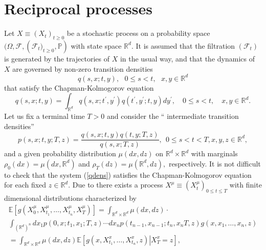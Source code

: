 \documentclass[a4paper,11pt]{amsart}
\theoremstyle{plain}
\theoremstyle{remark}
\begin{document}
\section{Reciprocal  processes}
\label{sec:rp}
Let $X\equiv\left(  X_{t}\right)  _{t\geq0}$ be a stochastic process on a
probability space $(  \Omega,\mathcal{F},\left(  \mathcal{F}_{t})
_{t\geq0},\mathbb{P}\right)  $ with state space $\mathbb{R}^{d}$. It is
assumed that the filtration $( \mathcal{F}_{t})  $ is generated by
the trajectories of $X$ in the usual way, and that the dynamics of $X$ are
governed by non-zero transition densities
\begin{equation}
q(s,x;t,y),\text{ }0\leq s<t,\text{ }x,y\in\mathbb{R}^{d} \label{pdens}%
\end{equation}
that satisfy the Chapman-Kolmogorov equation%
\begin{equation}
q(s,x;t,y)=\int_{\mathbb{R}^{d}}q(s,x;t^{\prime},y^{\prime})q(t^{\prime
},y^{\prime};t,y)dy^{\prime},\quad 0\leq s<t,\quad x,y\in\mathbb{R}^{d}.
\label{schroe0}%
\end{equation}
Let us fix a terminal time $T>0$ and consider the \textquotedblleft
intermediate transition densities\textquotedblright%
\begin{equation}
p(s,x;t,y;T,z)=\frac{q(s,x;t,y)q(t,y;T,z)}{q(s,x;T,z)},\ \ 0\leq s<t<T,\text{
}x,y,z\in\mathbb{R}^{d}, \label{qdens}%
\end{equation}
and a given probability distribution $\mu(dx,dz)$ on $\mathbb{R}^{d}%
\times\mathbb{R}^{d}$ with marginals $\rho_{0}(dx)=\mu(dx,\mathbb{R}^{d})$ and
$\rho_{T}(dz)=\mu(\mathbb{R}^{d},dz),$ respectively. It is not difficult to
check that the system (\ref{qdens}) satisfies the Chapman-Kolmogorov equation
for each fixed $z\in\mathbb{R}^{d}.$ Due to \cite{Jam74} there exists a
process $X^{\mu}\equiv\left(  X_{t}^{\mu}\right)  _{0\leq t\leq T}$ with
finite dimensional distributions characterized by%
\begin{multline}
\mathbb{E}\left[  g(X_{0}^{\mu},X_{t_{1}}^{\mu},\ldots,X_{t_{n}}^{\mu}%
,X_{T}^{\mu})\right]  =\int_{\mathbb{R}^{d}\times\mathbb{R}^{d}}%
\mu(dx,dz)\cdot\label{eq:schroe-findim}\\
\int_{\left(  \mathbb{R}^{d}\right)  ^{n}}dx_{1}p(0,x;t_{1},x_{1};T,z)\cdots
dx_{n}p(t_{n-1},x_{n-1};t_{n},x_{n}T,z)g(x,x_{1},\ldots,x_{n},z)\\
=\int_{\mathbb{R}^{d}\times\mathbb{R}^{d}}\mu(dx,dz)\mathbb{E}\left[  \left.
g\left(  x,X_{t_{1}}^{x},\ldots,X_{t_n}^{x},z\right)  \right\vert X_{T}%
^{x}=z\right]  ,
\end{multline}
\end{document}
